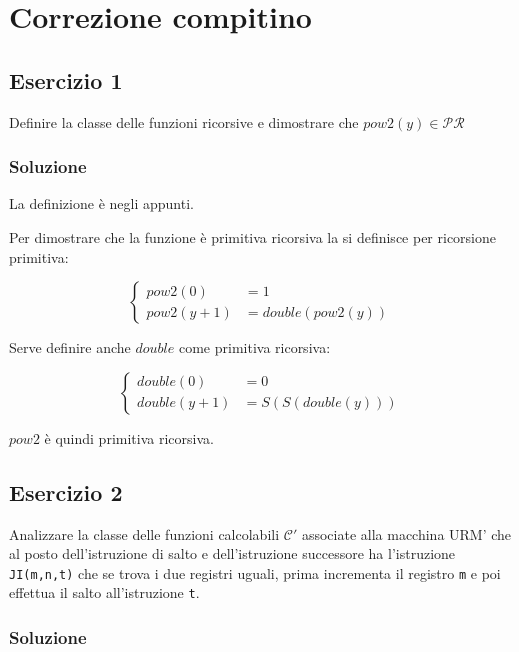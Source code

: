 
\section{Correzione compitino}

\subsection{Esercizio 1}

Definire la classe delle funzioni ricorsive e dimostrare che $ pow2(y)  \in \mathcal{PR} $

\subsubsection{Soluzione}

La definizione è negli appunti.

Per dimostrare che la funzione è primitiva ricorsiva la si definisce per ricorsione primitiva:

$$
\begin{cases}
pow2(0) &= 1 \\
pow2(y+1) &= double(pow2(y))
\end{cases}
$$

Serve definire anche $ double $ come primitiva ricorsiva:

$$
\begin{cases}
double(0) &= 0 \\
double(y+1) &= S(S(double(y)))
\end{cases}
$$

$ pow2 $ è quindi primitiva ricorsiva.

\subsection{Esercizio 2}

Analizzare la classe delle funzioni calcolabili $ \mathcal{C}' $ associate alla macchina URM' che al posto dell'istruzione di salto e dell'istruzione successore ha l'istruzione \texttt{JI(m,n,t)} che se trova i due registri uguali, prima incrementa il registro \texttt{m} e poi effettua il salto all'istruzione \texttt{t}.

\subsubsection{Soluzione}

